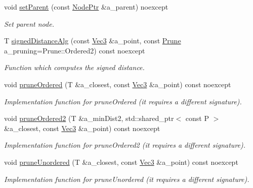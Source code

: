 \begin{DoxyCompactItemize}
void \hyperlink{classBVH_1_1NodeT_a92db0ab2d61c76469600478fddd04edc}{set\+Parent} (const \hyperlink{classBVH_1_1NodeT_a008f5c2c53adb1f5730d8478b48529b1}{Node\+Ptr} \&a\+\_\+parent) noexcept
\begin{DoxyCompactList}\small\item\em Set parent node. \end{DoxyCompactList}\item 
T \hyperlink{classBVH_1_1NodeT_a445cc87e9934d8117514de455ef1de47}{signed\+Distance\+Alg} (const \hyperlink{classBVH_1_1NodeT_a6fbb4308c5c55ee170c5f992df7ae1d0}{Vec3} \&a\+\_\+point, const \hyperlink{namespaceBVH_a3ddb7b34ac1deb3baed2f32d9eacbe5b}{Prune} a\+\_\+pruning=Prune\+::\+Ordered2) const noexcept
\begin{DoxyCompactList}\small\item\em Function which computes the signed distance. \end{DoxyCompactList}\item 
void \hyperlink{classBVH_1_1NodeT_ac4a3be457d66d2673f717f203e60fc08}{prune\+Ordered} (T \&a\+\_\+closest, const \hyperlink{classBVH_1_1NodeT_a6fbb4308c5c55ee170c5f992df7ae1d0}{Vec3} \&a\+\_\+point) const noexcept
\begin{DoxyCompactList}\small\item\em Implementation function for prune\+Ordered (it requires a different signature). \end{DoxyCompactList}\item 
void \hyperlink{classBVH_1_1NodeT_a2887ad51251739359602dde8db6a5998}{prune\+Ordered2} (T \&a\+\_\+min\+Dist2, std\+::shared\+\_\+ptr$<$ const P $>$ \&a\+\_\+closest, const \hyperlink{classBVH_1_1NodeT_a6fbb4308c5c55ee170c5f992df7ae1d0}{Vec3} \&a\+\_\+point) const noexcept
\begin{DoxyCompactList}\small\item\em Implementation function for prune\+Ordered2 (it requires a different signature). \end{DoxyCompactList}\item 
void \hyperlink{classBVH_1_1NodeT_ad252aa451ca983750dfa0c24344253b2}{prune\+Unordered} (T \&a\+\_\+closest, const \hyperlink{classBVH_1_1NodeT_a6fbb4308c5c55ee170c5f992df7ae1d0}{Vec3} \&a\+\_\+point) const noexcept
\begin{DoxyCompactList}\small\item\em Implementation function for prune\+Unordered (it requires a different signature). \end{DoxyCompactList}\item 

\end{DoxyCompactItemize}
